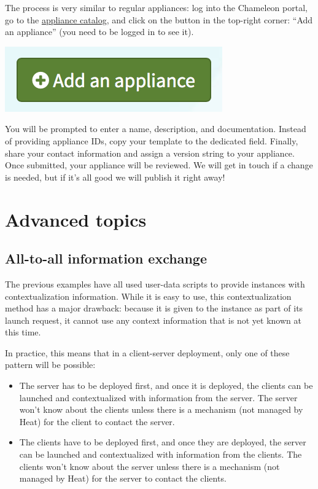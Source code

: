 The process is very similar to regular appliances: log into the
Chameleon portal, go to the
\href{https://www.chameleoncloud.org/appliances/}{appliance catalog},
and click on the button in the top-right corner: ``Add an appliance''
(you need to be logged in to see it).

{\centering \includegraphics[width=0.25\columnwidth]{images/chameleon/Add-an-appliance.png}}

You will be prompted to enter a name, description, and documentation.
Instead of providing appliance IDs, copy your template to the dedicated
field. Finally, share your contact information and assign a version
string to your appliance. Once submitted, your appliance will be
reviewed. We will get in touch if a change is needed, but if it's all
good we will publish it right away!

\section{Advanced topics}\label{advanced-topics}

\subsection{All-to-all information
exchange}\label{all-to-all-information-exchange}

The previous examples have all used user-data scripts to provide
instances with contextualization information. While it is easy to use,
this contextualization method has a major drawback: because it is given
to the instance as part of its launch request, it cannot use any context
information that is not yet known at this time.

In practice, this means that in a client-server deployment, only one of
these pattern will be possible:

\begin{itemize}
\item
  The server has to be deployed first, and once it is deployed, the
  clients can be launched and contextualized with information from the
  server. The server won't know about the clients unless there is a
  mechanism (not managed by Heat) for the client to contact the server.
\item
  The clients have to be deployed first, and once they are deployed, the
  server can be launched and contextualized with information from the
  clients. The clients won't know about the server unless there is a
  mechanism (not managed by Heat) for the server to contact the clients.
\end{itemize}

